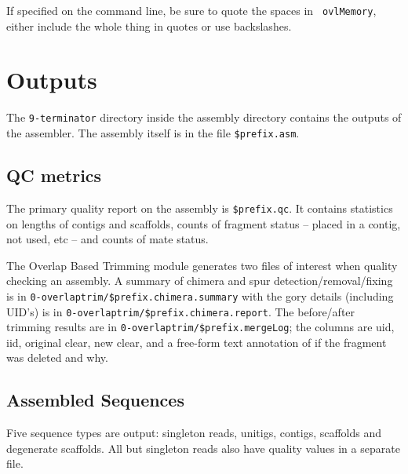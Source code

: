 \documentclass[twoside,11pt]{article}
\begin{document}
If specified on the command line, be sure to quote the spaces in {\tt
ovlMemory}, either include the whole thing in quotes or use backslashes.

\section{Outputs}

The {\tt 9-terminator} directory inside the assembly directory
contains the outputs of the assembler.  The assembly itself is in the
file {\tt \$prefix.asm}.

\subsection{QC metrics}

The primary quality report on the assembly is {\tt \$prefix.qc}.  It
contains statistics on lengths of contigs and scaffolds, counts of
fragment status -- placed in a contig, not used, etc -- and counts of
mate status.

The Overlap Based Trimming module generates two files of interest
when quality checking an assembly.  A summary of chimera and spur
detection/removal/fixing is in {\tt 0-overlaptrim/\$prefix.chimera.summary} with the gory
details (including UID's) is in {\tt 0-overlaptrim/\$prefix.chimera.report}.  The
before/after trimming results are in {\tt 0-overlaptrim/\$prefix.mergeLog}; the columns are
uid, iid, original clear, new clear, and a free-form text annotation
of if the fragment was deleted and why.

\subsection{Assembled Sequences}

Five sequence types are output: singleton reads, unitigs, contigs,
scaffolds and degenerate scaffolds.  All but singleton reads also have
quality values in a separate file.
\end{document}
